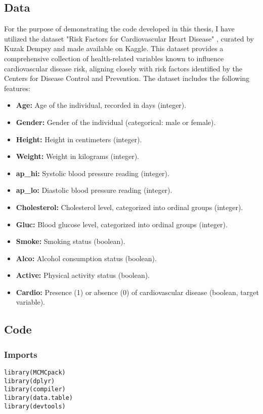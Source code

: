 \subsection{Data}
For the purpose of demonstrating the code developed in this thesis, I have utilized the dataset "Risk Factors for Cardiovascular Heart Disease" \cite{dempsy2022risk}, curated by Kuzak Dempsy and made available on Kaggle. This dataset provides a comprehensive collection of health-related variables known to influence cardiovascular disease risk, aligning closely with risk factors identified by the Centers for Disease Control and Prevention.\cite{cdc2023heart}
The dataset includes the following features:
\begin{itemize}
    \item \textbf{Age:} Age of the individual, recorded in days (integer).
    \item \textbf{Gender:} Gender of the individual (categorical: male or female).
    \item \textbf{Height:} Height in centimeters (integer).
    \item \textbf{Weight:} Weight in kilograms (integer).
    \item \textbf{ap\_hi:} Systolic blood pressure reading (integer).
    \item \textbf{ap\_lo:} Diastolic blood pressure reading (integer).
    \item \textbf{Cholesterol:} Cholesterol level, categorized into ordinal groups (integer).
    \item \textbf{Gluc:} Blood glucose level, categorized into ordinal groups (integer).
    \item \textbf{Smoke:} Smoking status (boolean).
    \item \textbf{Alco:} Alcohol consumption status (boolean).
    \item \textbf{Active:} Physical activity status (boolean).
    \item \textbf{Cardio:} Presence (1) or absence (0) of cardiovascular disease (boolean, target variable).
\end{itemize}

\subsection{Code}
\subsubsection{Imports}
\begin{lstlisting}
library(MCMCpack)
library(dplyr)
library(compiler)
library(data.table)
library(devtools)
\end{lstlisting}

